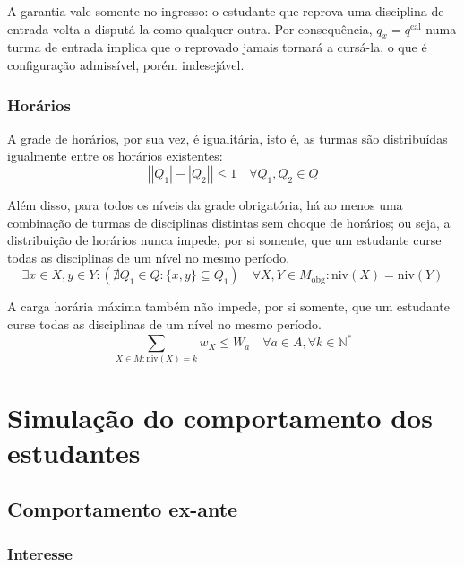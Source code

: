 \documentclass[
    12pt,
    openany,
    oneside,
    a4paper,
    english,
    brazil
]{abntex2}
\begin{document}
A garantia vale somente no ingresso: o estudante que reprova uma disciplina de entrada volta a disputá-la como qualquer outra. Por consequência, $q_x = q^\text{cal}$ numa turma de entrada implica que o reprovado jamais tornará a cursá-la, o que é configuração admissível, porém indesejável.

\subsubsection{Horários}

A grade de horários, por sua vez, é igualitária, isto é, as turmas são distribuídas igualmente entre os horários existentes:
\begin{equation}
    \left||Q_1| - |Q_2|\right| \leq 1 \quad \forall Q_1, Q_2 \in Q
\end{equation}

Além disso, para todos os níveis da grade obrigatória, há ao menos uma combinação de turmas de disciplinas distintas sem choque de horários; ou seja, a distribuição de horários nunca impede, por si somente, que um estudante curse todas as disciplinas de um nível no mesmo período.
\begin{equation}
    \exists x \in X, y \in Y : \left(\nexists Q_1 \in Q : \{x, y\} \subseteq Q_1 \right)
    \quad \forall X, Y \in M_\text{obg} : \mathrm{niv}(X) = \mathrm{niv}(Y)
\end{equation}

A carga horária máxima também não impede, por si somente, que um estudante curse todas as disciplinas de um nível no mesmo período.
\begin{equation}
    \sum_{X \in M : \mathrm{niv}(X) = k} w_X \leq W_a
    \quad \forall a \in A, \forall k \in \mathbb{N^*}
\end{equation}

\section{Simulação do comportamento dos estudantes}

\subsection{Comportamento ex-ante}

\subsubsection{Interesse}
\label{sec:interesse}
\end{document}
